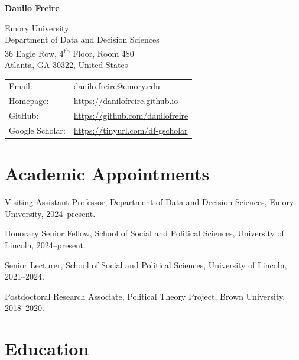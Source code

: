 \documentclass[a4paper]{article}
\def\name{Danilo Freire}
\renewenvironment{itemize}{
	\begin{list}{}{
			\setlength{\leftmargin}{1.5em}
		}
		}{
	\end{list}
}
\begin{document}
{\huge \bf \name}


\vspace{0.25in}

\begin{minipage}{0.45\linewidth}
	Emory University\\
    Department of Data and Decision Sciences\\
	36 Eagle Row, 4\textsuperscript{th} Floor, Room 480\\
	Atlanta, GA 30322, United States
\end{minipage}
\begin{minipage}{0.45\linewidth}
	\begin{tabular}{ll}
		Email:          & \href{mailto:danilo.freire@emory.edu}{danilo.freire@emory.edu}          \\
		Homepage:       & \href{https://danilofreire.github.io/}{https://danilofreire.github.io} \\
		GitHub:         & \href{https://github.com/danilofreire}{https://github.com/danilofreire} \\
		Google Scholar: & \href{https://tinyurl.com/df-gscholar}{https://tinyurl.com/df-gscholar}
	\end{tabular}
	\end{minipage}

\section*{Academic Appointments}

\begin{itemize}
\item Visiting Assistant Professor, Department of Data and Decision Sciences, Emory University, 2024--present.
\item Honorary Senior Fellow, School of Social and Political Sciences, University of Lincoln, 2024--present.
\item Senior Lecturer, School of Social and Political Sciences, University of Lincoln, 2021--2024.
\item Postdoctoral Research Associate, Political Theory Project, Brown University, 2018--2020.
\end{itemize}

\section*{Education}
\end{document}

